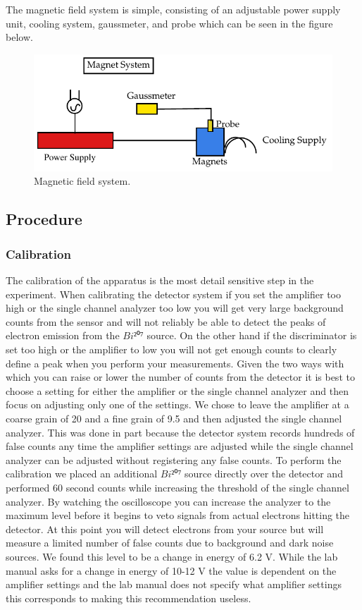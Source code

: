 The magnetic field system is simple, consisting of an adjustable power supply unit, cooling system, gaussmeter, and probe which can be seen in the figure below. 

\begin{figure}[H]
\begin{center}
\includegraphics[width=4 in]{REM-figures3.pdf}
\caption{Magnetic field system.}
\end{center}
\end{figure}

\subsection{Procedure}

\subsubsection{Calibration}
The calibration of the apparatus is the most detail sensitive step in the experiment.  When calibrating the detector system if you set the amplifier too high or the single channel analyzer too low you will get very large background counts from the sensor and will not reliably be able to detect the peaks of electron emission from the $Bi²⁰⁷$ source.  On the other hand if the discriminator is set too high or the amplifier to low you will not get enough counts to clearly define a peak when you perform your measurements. Given the two ways with which you can raise or lower the number of counts from the detector it is best to choose a setting for either the amplifier or the single channel analyzer and then focus on adjusting only one of the settings.  We chose to leave the amplifier at a coarse grain of 20 and a fine grain of 9.5 and then adjusted the single channel analyzer.  This was done in part because the detector system records hundreds of false counts any time the amplifier settings are adjusted while the single channel analyzer can be adjusted without registering any false counts. To perform the calibration we placed an additional $Bi²⁰⁷$ source directly over the detector and performed 60 second counts while increasing the threshold of the single channel analyzer. By watching the oscilloscope you can increase the analyzer to the maximum level before it begins to veto signals from actual electrons hitting the detector. At this point you will detect electrons from your source but will measure a limited number of false counts due to background and dark noise sources.  We found this level to be a change in energy of 6.2 V.  While the lab manual asks for a change in energy of 10-12 V the value is dependent on the amplifier settings and the lab manual does not specify what amplifier settings this corresponds to making this recommendation useless.

